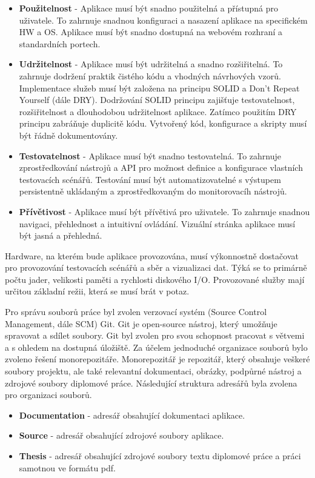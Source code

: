 \begin{itemize}
  \item \textbf{Použitelnost} - Aplikace musí být snadno použitelná a přístupná pro uživatele. To zahrnuje snadnou konfiguraci a nasazení aplikace na specifickém HW a OS. Aplikace musí být snadno dostupná na webovém rozhraní a standardních portech.
  \item \textbf{Udržitelnost} - Aplikace musí být udržitelná a snadno rozšiřitelná. To zahrnuje dodržení praktik čistého kódu a vhodných návrhových vzorů. Implementace služeb musí být založena na principu SOLID a Don't Repeat Yourself (dále DRY). Dodržování SOLID principu zajišťuje testovatelnost, rozšiřitelnost a dlouhodobou udržitelnost aplikace. Zatímco použitím DRY principu zabráňuje duplicitě kódu. Vytvořený kód, konfigurace a skripty musí být řádně dokumentovány.
  \item \textbf{Testovatelnost} - Aplikace musí být snadno testovatelná. To zahrnuje zprostředkování nástrojů a API pro možnost definice a konfigurace vlastních testovacích scénářů. Testování musí být automatizovatelné s výstupem persistentně ukládaným a zprostředkovaným do monitorovacíh nástrojů.
  \item \textbf{Přívětivost} - Aplikace musí být přívětivá pro uživatele. To zahrnuje snadnou navigaci, přehlednost a intuitivní ovládání. Vizuální stránka aplikace musí být jasná a přehledná.
\end{itemize}


Hardware, na kterém bude aplikace provozována, musí výkonnostně dostačovat pro provozování testovacích scénářů a sběr a vizualizaci dat. Týká se to primárně počtu jader, velikosti paměti a rychlosti diskového I/O. Provozované služby mají určitou základní režii, která se musí brát v potaz.


Pro správu souborů práce byl zvolen verzovací systém (Source Control Management, dále SCM) Git. Git je open-source nástroj, který umožňuje spravovat a sdílet soubory. Git byl zvolen pro svou schopnost pracovat s větvemi a s ohledem na dostupná úložiště. Za účelem jednoduché organizace souborů bylo zvoleno řešení monorepozitáře. Monorepozitář je repozitář, který obsahuje veškeré soubory projektu, ale také relevantní dokumentaci, obrázky, podpůrné nástroj a zdrojové soubory diplomové práce. Následující struktura adresářů byla zvolena pro organizaci souborů.

\begin{itemize}
    \item \textbf{Documentation} - adresář obsahující dokumentaci aplikace.
    \item \textbf{Source} - adresář obsahující zdrojové soubory aplikace.
    \item \textbf{Thesis} - adresář obsahující zdrojové soubory textu diplomové práce a práci samotnou ve formátu pdf.
\end{itemize}

